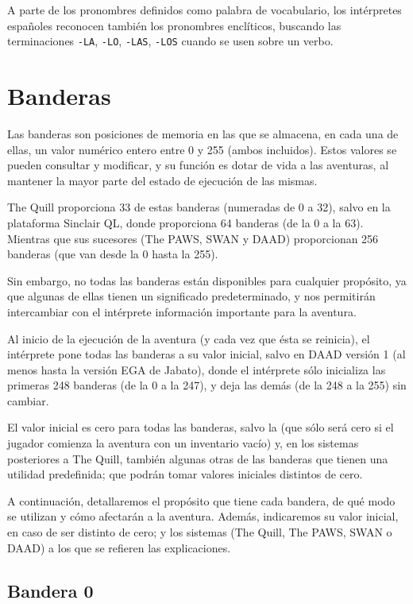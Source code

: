 \documentclass[11pt, a5paper]{article}
\newcommand{\quill}{\textsf{The Quill}\xspace}
\newcommand{\paw}{\textsf{The PAWS}\xspace}
\newcommand{\swan}{\textsf{SWAN}\xspace}
\newcommand{\daad}{\textsf{DAAD}\xspace}
\begin{document}
A parte de los pronombres definidos como palabra de vocabulario, los intérpretes españoles reconocen también los pronombres enclíticos, buscando las terminaciones \texttt{-LA}, \texttt{-LO}, \texttt{-LAS}, \texttt{-LOS} cuando se usen sobre un verbo.


\section{Banderas}

Las banderas son posiciones de memoria en las que se almacena, en cada una de ellas, un valor numérico entero entre 0 y 255 (ambos incluidos). Estos valores se pueden consultar y modificar, y su función es dotar de vida a las aventuras, al mantener la mayor parte del estado de ejecución de las mismas.

\quill proporciona 33 de estas banderas (numeradas de 0 a 32), salvo en la plataforma Sinclair QL, donde proporciona 64 banderas (de la 0 a la 63). Mientras que sus sucesores (\paw, \swan y \daad) proporcionan 256 banderas (que van desde la 0 hasta la 255).

Sin embargo, no todas las banderas están disponibles para cualquier propósito, ya que algunas de ellas tienen un significado predeterminado, y nos permitirán intercambiar con el intérprete información importante para la aventura.

Al inicio de la ejecución de la aventura (y cada vez que ésta se reinicia), el intérprete pone todas las banderas a su valor inicial, salvo en \daad versión 1 (al menos hasta la versión EGA de Jabato), donde el intérprete sólo inicializa las primeras 248 banderas (de la 0 a la 247), y deja las demás (de la 248 a la 255) sin cambiar.

El valor inicial es cero para todas las banderas, salvo la  (que sólo será cero si el jugador comienza la aventura con un inventario vacío) y, en los sistemas posteriores a \quill, también algunas otras de las banderas que tienen una utilidad predefinida; que podrán tomar valores iniciales distintos de cero.

A continuación, detallaremos el propósito que tiene cada bandera, de qué modo se utilizan y cómo afectarán a la aventura. Además, indicaremos su valor inicial, en caso de ser distinto de cero; y los sistemas (\quill, \paw, \swan o \daad) a los que se refieren las explicaciones.

\subsection{Bandera 0}
\end{document}

